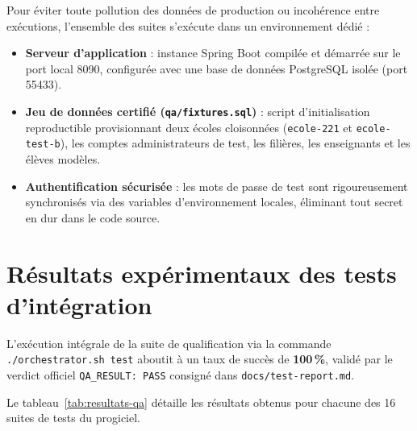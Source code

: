 Pour éviter toute pollution des données de production ou incohérence entre exécutions, l'ensemble des suites s'exécute dans un environnement dédié :
\begin{itemize}
    \item \textbf{Serveur d'application} : instance Spring Boot compilée et démarrée sur le port local 8090, configurée avec une base de données PostgreSQL isolée (port 55433).
    \item \textbf{Jeu de données certifié (\texttt{qa/fixtures.sql})} : script d'initialisation reproductible provisionnant deux écoles cloisonnées (\texttt{ecole-221} et \texttt{ecole-test-b}), les comptes administrateurs de test, les filières, les enseignants et les élèves modèles.
    \item \textbf{Authentification sécurisée} : les mots de passe de test sont rigoureusement synchronisés via des variables d'environnement locales, éliminant tout secret en dur dans le code source.
\end{itemize}

\section{Résultats expérimentaux des tests d'intégration}

L'exécution intégrale de la suite de qualification via la commande \texttt{./orchestrator.sh test} aboutit à un taux de succès de \textbf{100\,\%}, validé par le verdict officiel \texttt{QA\_RESULT: PASS} consigné dans \nolinkurl{docs/test-report.md}.

Le tableau~\ref{tab:resultats-qa} détaille les résultats obtenus pour chacune des 16 suites de tests du progiciel.

